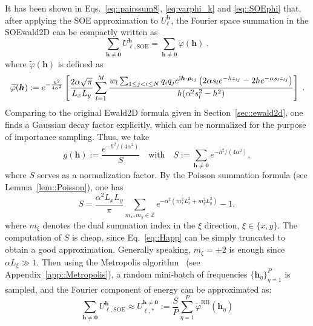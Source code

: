 
It has been shown in Eqs.~\eqref{eq::pairssum8}, \eqref{eq:varphi_k} and \eqref{eq::SOEphi} that, after applying the SOE approximation to $U_{\ell}^{\bm{h}}$, the Fourier space summation in the SOEwald2D can be compactly written as
\begin{equation}
	\sum_{\bm{h}\neq\bm{0}} U_{\ell,\text{SOE}}^{\bm{h}} = \sum_{\bm{h}\neq\bm{0}} \widetilde{\varphi} (\bm{h})\;,
\end{equation}
where $\widetilde{\varphi} ({\bm{h}})$ is defined as
\begin{equation}
	\widetilde{\varphi} ({\bm{h}}) := e^{-\frac{h^2}{4 \alpha^2}} \left[ \frac{2\alpha\sqrt{\pi}}{L_xL_y}\sum_{l = 1}^{M}  \frac{w_l \sum_{1\leq j < i \leq N}q_{i} q_{j} e^{\mathrm{i}\boldsymbol{h} \cdot \boldsymbol{\rho}_{ij}} \left(2\alpha s_l e^{-h z_{ij}}-2h e^{-\alpha s_l z_{ij}}\right) }{h(\alpha^2 s_l^2 - h^2)} \right] \;.
\end{equation}
Comparing to the original Ewald2D formula given in Section~\ref{sec::ewald2d}, one finds a Gaussian decay factor explicitly, which can be normalized for the purpose of importance sampling.
Thus, we take
\begin{equation}\label{eq::hk}
	g(\bm{h}) := \frac{e^{-h^2/(4\alpha^2)}}{S}\quad\text{with}\quad S := \sum_{\bm{h}\neq\bm{0}}e^{-h^2/(4\alpha^2)},
\end{equation}
where $S$ serves as a normalization factor. 
By the Poisson summation formula (see Lemma~\ref{lem::Poisson}), one has 
\begin{equation}\label{eq::Happ}
	S=\frac{\alpha^2 L_xL_y}{\pi}\sum_{m_x,m_y\in\mathbb{Z}}e^{-\alpha^2(m_x^2L_x^2+m_y^2L_y^2)}-1,
\end{equation}
where $m_{\xi}$ denotes the dual summation index in the $\xi$ direction, $\xi\in\{x,y\}$. 
The computation of $S$ is cheap, since Eq.~\eqref{eq::Happ} can be simply truncated to obtain a good approximation. 
Generally speaking, $m_{\xi}=\pm 2$ is enough since $\alpha L_{\xi}\gg 1$.
Then using the Metropolis algorithm~\cite{metropolis1953equation, hastings1970monte} (see Appendix~\ref{app::Metropolis}), a random mini-batch of frequencies $\{\bm{h}_{\eta}\}_{\eta=1}^P$ is sampled, and the Fourier component of energy can be approximated as:
\begin{equation}\label{eq::RBapp}
	\sum_{\bm{h}\neq\bm{0}} U_{\ell,\text{SOE}}^{\bm{h}} \approx U_{\ell,*}^{\bm{h}\neq\bm{0}} := \frac{S}{P}\sum_{\eta=1}^{P}\widetilde{\varphi}^{\text{RB}}(\bm{h}_{\eta})
\end{equation}

